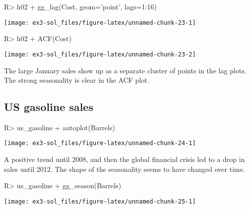 \documentclass[
]{article}
\begin{document}
\begin{CodeChunk}
\begin{CodeInput}
R> h02 %
+   gg_lag(Cost, geom='point', lags=1:16)
\end{CodeInput}


\begin{center}\texttt{[image: ex3-sol\_files/figure-latex/unnamed-chunk-23-1]} \end{center}

\begin{CodeInput}
R> h02 %
+   ACF(Cost) %
\end{CodeInput}


\begin{center}\texttt{[image: ex3-sol\_files/figure-latex/unnamed-chunk-23-2]} \end{center}

\end{CodeChunk}

The large January sales show up as a separate cluster of points in the lag plots. The strong seasonality is clear in the ACF plot.

\hypertarget{us-gasoline-sales}{%
\subsection{US gasoline sales}\label{us-gasoline-sales}}

\begin{CodeChunk}
\begin{CodeInput}
R> us_gasoline %
+   autoplot(Barrels)
\end{CodeInput}


\begin{center}\texttt{[image: ex3-sol\_files/figure-latex/unnamed-chunk-24-1]} \end{center}

\end{CodeChunk}

A positive trend until 2008, and then the global financial crisis led to a drop in sales until 2012. The shape of the seasonality seems to have changed over time.

\begin{CodeChunk}
\begin{CodeInput}
R> us_gasoline %
+   gg_season(Barrels)
\end{CodeInput}


\begin{center}\texttt{[image: ex3-sol\_files/figure-latex/unnamed-chunk-25-1]} \end{center}

\end{CodeChunk}
\end{document}

